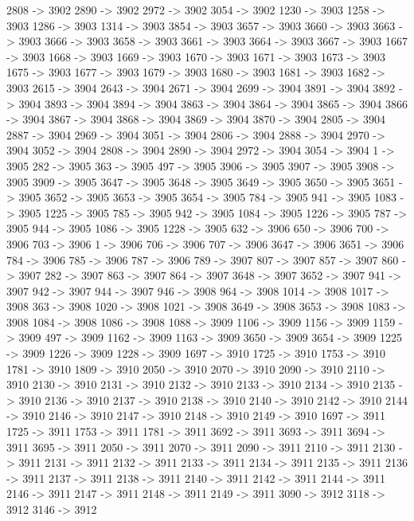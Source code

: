 {	2808 -> 3902
	2890 -> 3902
	2972 -> 3902
	3054 -> 3902
	1230 -> 3903
	1258 -> 3903
	1286 -> 3903
	1314 -> 3903
	3854 -> 3903
	3657 -> 3903
	3660 -> 3903
	3663 -> 3903
	3666 -> 3903
	3658 -> 3903
	3661 -> 3903
	3664 -> 3903
	3667 -> 3903
	1667 -> 3903
	1668 -> 3903
	1669 -> 3903
	1670 -> 3903
	1671 -> 3903
	1673 -> 3903
	1675 -> 3903
	1677 -> 3903
	1679 -> 3903
	1680 -> 3903
	1681 -> 3903
	1682 -> 3903
	2615 -> 3904
	2643 -> 3904
	2671 -> 3904
	2699 -> 3904
	3891 -> 3904
	3892 -> 3904
	3893 -> 3904
	3894 -> 3904
	3863 -> 3904
	3864 -> 3904
	3865 -> 3904
	3866 -> 3904
	3867 -> 3904
	3868 -> 3904
	3869 -> 3904
	3870 -> 3904
	2805 -> 3904
	2887 -> 3904
	2969 -> 3904
	3051 -> 3904
	2806 -> 3904
	2888 -> 3904
	2970 -> 3904
	3052 -> 3904
	2808 -> 3904
	2890 -> 3904
	2972 -> 3904
	3054 -> 3904
	1 -> 3905
	282 -> 3905
	363 -> 3905
	497 -> 3905
	3906 -> 3905
	3907 -> 3905
	3908 -> 3905
	3909 -> 3905
	3647 -> 3905
	3648 -> 3905
	3649 -> 3905
	3650 -> 3905
	3651 -> 3905
	3652 -> 3905
	3653 -> 3905
	3654 -> 3905
	784 -> 3905
	941 -> 3905
	1083 -> 3905
	1225 -> 3905
	785 -> 3905
	942 -> 3905
	1084 -> 3905
	1226 -> 3905
	787 -> 3905
	944 -> 3905
	1086 -> 3905
	1228 -> 3905
	632 -> 3906
	650 -> 3906
	700 -> 3906
	703 -> 3906
	1 -> 3906
	706 -> 3906
	707 -> 3906
	3647 -> 3906
	3651 -> 3906
	784 -> 3906
	785 -> 3906
	787 -> 3906
	789 -> 3907
	807 -> 3907
	857 -> 3907
	860 -> 3907
	282 -> 3907
	863 -> 3907
	864 -> 3907
	3648 -> 3907
	3652 -> 3907
	941 -> 3907
	942 -> 3907
	944 -> 3907
	946 -> 3908
	964 -> 3908
	1014 -> 3908
	1017 -> 3908
	363 -> 3908
	1020 -> 3908
	1021 -> 3908
	3649 -> 3908
	3653 -> 3908
	1083 -> 3908
	1084 -> 3908
	1086 -> 3908
	1088 -> 3909
	1106 -> 3909
	1156 -> 3909
	1159 -> 3909
	497 -> 3909
	1162 -> 3909
	1163 -> 3909
	3650 -> 3909
	3654 -> 3909
	1225 -> 3909
	1226 -> 3909
	1228 -> 3909
	1697 -> 3910
	1725 -> 3910
	1753 -> 3910
	1781 -> 3910
	1809 -> 3910
	2050 -> 3910
	2070 -> 3910
	2090 -> 3910
	2110 -> 3910
	2130 -> 3910
	2131 -> 3910
	2132 -> 3910
	2133 -> 3910
	2134 -> 3910
	2135 -> 3910
	2136 -> 3910
	2137 -> 3910
	2138 -> 3910
	2140 -> 3910
	2142 -> 3910
	2144 -> 3910
	2146 -> 3910
	2147 -> 3910
	2148 -> 3910
	2149 -> 3910
	1697 -> 3911
	1725 -> 3911
	1753 -> 3911
	1781 -> 3911
	3692 -> 3911
	3693 -> 3911
	3694 -> 3911
	3695 -> 3911
	2050 -> 3911
	2070 -> 3911
	2090 -> 3911
	2110 -> 3911
	2130 -> 3911
	2131 -> 3911
	2132 -> 3911
	2133 -> 3911
	2134 -> 3911
	2135 -> 3911
	2136 -> 3911
	2137 -> 3911
	2138 -> 3911
	2140 -> 3911
	2142 -> 3911
	2144 -> 3911
	2146 -> 3911
	2147 -> 3911
	2148 -> 3911
	2149 -> 3911
	3090 -> 3912
	3118 -> 3912
	3146 -> 3912
}
